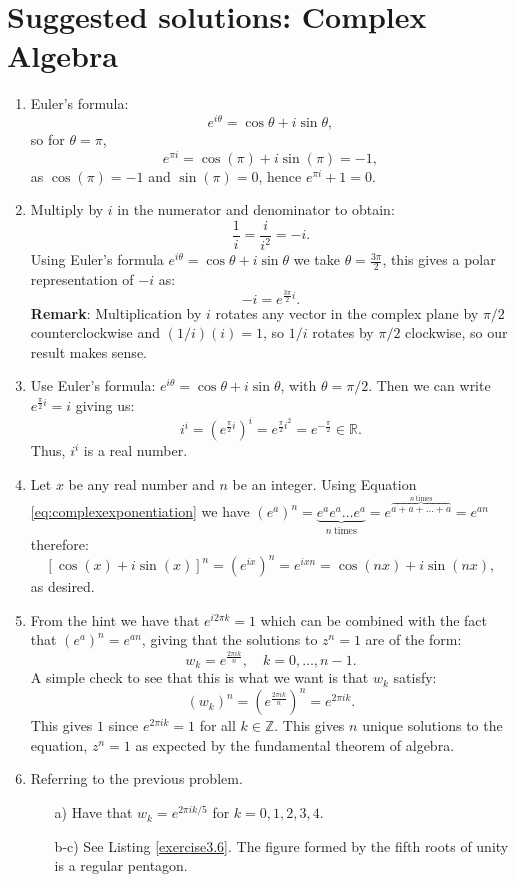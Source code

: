 \newpage
\section{Suggested solutions: Complex Algebra}
\begin{enumerate}

\item Euler's formula:
$$e^{i\theta}=\cos\theta+i\sin\theta,$$
so for $\theta=\pi$,
$$e^{\pi i}=\cos(\pi)+i\sin(\pi)=-1,$$
as $\cos(\pi)=-1$ and $\sin(\pi)=0$, hence $e^{\pi i}+1=0$. 

\item Multiply by $i$ in the numerator and denominator to obtain:
$$\frac{1}{i}=\frac{i}{i^{2}}=-i.$$
Using Euler's formula $e^{i\theta}=\cos\theta+i\sin\theta$ we take $\theta=\frac{3\pi}{2}$, this gives a polar representation of $-i$ as:
$$-i=e^{\frac{3\pi}{2}i}.$$
\textbf{Remark}: Multiplication by $i$ rotates any vector in the complex plane 
by $\pi/2$ counterclockwise and $(1/i)(i)=1$, so $1/i$ rotates by $\pi/2$ clockwise, so our result makes sense. 

\item Use Euler's formula: $e^{i\theta}=\cos\theta+i\sin\theta$, with $\theta=\pi/2$. Then we can write $e^{\frac{\pi}{2}i}=i$ giving us:
$$i^{i}=(e^{\frac{\pi}{2}i})^{i}=e^{\frac{\pi}{2}i^{2}}=e^{-\frac{\pi}{2}}\in\mathbb{R}.$$
Thus, $i^{i}$ is a real number. 

\item Let $x$ be any real number and $n$ be an integer. Using Equation \ref{eq:complexexponentiation} we 
have $(e^{a})^{n}=\underbrace{e^{a}e^{a}\hdots e^{a}}_{n\ \text{times}}=e^{\overbrace{a+a+\hdots+a}^{n\ \text{times}}}=e^{an}$ therefore:
$$[\cos(x)+i\sin(x)]^{n}=(e^{ix})^{n}=e^{ixn}=\cos(nx)+i\sin(nx),$$
as desired. 

\item From the hint we have that $e^{i2\pi k}=1$ which can be combined with 
the fact that $(e^{a})^{n}=e^{an}$, giving that the solutions to $z^{n}=1$ are of the form:
$$w_{k}=e^{\frac{2\pi i k}{n}}, \quad k=0,\hdots,n-1.$$
A simple check to see that this is what we want is that $w_{k}$ satisfy:
$$(w_{k})^{n}=(e^{\frac{2\pi ik}{n}})^{n}=e^{2\pi ik}.$$
This gives $1$ since $e^{2\pi ik}=1$ for all $k\in\mathbb{Z}$. 
This gives $n$ unique solutions to the equation, $z^{n}=1$ as expected by the fundamental theorem of algebra.  

\item Referring to the previous problem.
\begin{itemize}
    \item[a)] Have that $w_{k}=e^{2\pi ik/5}$ for $k=0,1,2,3,4$. 
    \item[b-c)] See Listing \ref{exercise3.6}. The figure formed by the fifth roots of unity is a regular pentagon. 
\end{itemize}


\end{enumerate}
